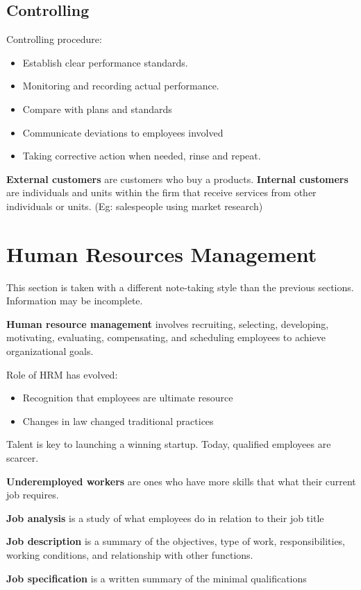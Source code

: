 \documentclass[english, 12pt]{article}
\begin{document}
\subsection{Controlling}
Controlling procedure:
\begin{itemize}
\item Establish clear performance standards.
\item Monitoring and recording actual performance.
\item Compare with plans and standards
\item Communicate deviations to employees involved
\item Taking corrective action when needed, rinse and repeat.
\end{itemize}
\begin{defn}
\textbf{External customers} are customers who buy a products. \textbf{Internal customers} are individuals and units within the firm that receive services from other individuals or units. (Eg: salespeople using market research)
\end{defn}
\section{Human Resources Management}
\begin{note}
This section is taken with a different note-taking style than the previous sections. Information may be incomplete.
\end{note}
\begin{defn}
\textbf{Human resource management} involves recruiting, selecting, developing, motivating, evaluating, compensating, and scheduling employees to achieve organizational goals.
\end{defn}
Role of HRM has evolved:
\begin{itemize}
\item Recognition that employees are ultimate resource
\item Changes in law changed traditional practices
\end{itemize}
Talent is key to launching a winning startup. Today, qualified employees are scarcer.
\begin{defn}
\textbf{Underemployed workers} are ones who have more skills that what their current job requires.
\end{defn}
\begin{defn}
\textbf{Job analysis} is a study of what employees do in relation to their job title
\end{defn}
\begin{defn}
\textbf{Job description} is a summary of the objectives, type of work, responsibilities, working conditions, and relationship with other functions.
\end{defn}
\begin{defn}
\textbf{Job specification} is a written summary of the minimal qualifications
\end{defn}
\end{document}
